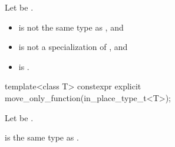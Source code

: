 \begin{itemdescr}
\pnum
Let  be .

\pnum
\constraints
\begin{itemize}
\item {} is not the same type as , and
\item {} is not a specialization of , and
\item {} is .
\end{itemize}
\end{itemdescr}

%
\begin{itemdecl}
template<class T>
  constexpr explicit move_only_function(in_place_type_t<T>);
\end{itemdecl}

\begin{itemdescr}
\pnum
Let  be .

\pnum
\mandates
{} is the same type as .
\end{itemdescr}
